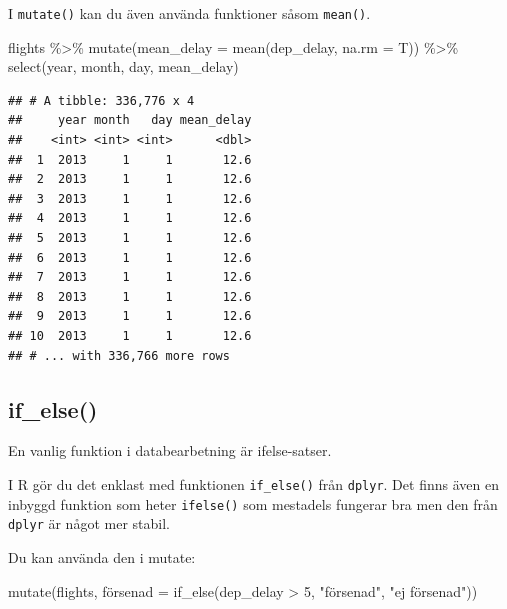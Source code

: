 \documentclass[
]{book}
\newenvironment{Shaded}{\begin{snugshade}}{\end{snugshade}}
\newcommand{\AttributeTok}[1]{\textcolor[rgb]{0.77,0.63,0.00}{#1}}
\newcommand{\DecValTok}[1]{\textcolor[rgb]{0.00,0.00,0.81}{#1}}
\newcommand{\FunctionTok}[1]{\textcolor[rgb]{0.00,0.00,0.00}{#1}}
\newcommand{\NormalTok}[1]{#1}
\newcommand{\OtherTok}[1]{\textcolor[rgb]{0.56,0.35,0.01}{#1}}
\newcommand{\SpecialCharTok}[1]{\textcolor[rgb]{0.00,0.00,0.00}{#1}}
\newcommand{\StringTok}[1]{\textcolor[rgb]{0.31,0.60,0.02}{#1}}
\begin{document}
I \texttt{mutate()} kan du även använda funktioner såsom \texttt{mean()}.

\begin{Shaded}
\begin{Highlighting}[]
\NormalTok{flights }\SpecialCharTok{\%\textgreater{}\%} 
  \FunctionTok{mutate}\NormalTok{(}\AttributeTok{mean\_delay =} \FunctionTok{mean}\NormalTok{(dep\_delay, }\AttributeTok{na.rm =}\NormalTok{ T)) }\SpecialCharTok{\%\textgreater{}\%} 
  \FunctionTok{select}\NormalTok{(year, month, day, mean\_delay)}
\end{Highlighting}
\end{Shaded}

\begin{verbatim}
## # A tibble: 336,776 x 4
##     year month   day mean_delay
##    <int> <int> <int>      <dbl>
##  1  2013     1     1       12.6
##  2  2013     1     1       12.6
##  3  2013     1     1       12.6
##  4  2013     1     1       12.6
##  5  2013     1     1       12.6
##  6  2013     1     1       12.6
##  7  2013     1     1       12.6
##  8  2013     1     1       12.6
##  9  2013     1     1       12.6
## 10  2013     1     1       12.6
## # ... with 336,766 more rows
\end{verbatim}

\hypertarget{if_else}{%
\subsection{if\_else()}\label{if_else}}

En vanlig funktion i databearbetning är ifelse-satser.

I R gör du det enklast med funktionen \texttt{if\_else()} från \texttt{dplyr}. Det finns även en inbyggd funktion som heter \texttt{ifelse()} som mestadels fungerar bra men den från \texttt{dplyr} är något mer stabil.

Du kan använda den i mutate:

\begin{Shaded}
\begin{Highlighting}[]
\FunctionTok{mutate}\NormalTok{(flights, försenad }\OtherTok{=} \FunctionTok{if\_else}\NormalTok{(dep\_delay  }\SpecialCharTok{\textgreater{}} \DecValTok{5}\NormalTok{, }\StringTok{"försenad"}\NormalTok{, }\StringTok{"ej försenad"}\NormalTok{))}
\end{Highlighting}
\end{Shaded}
\end{document}
